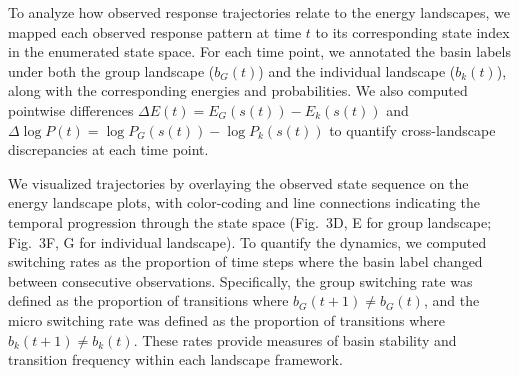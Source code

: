 To analyze how observed response trajectories relate to the energy landscapes, we mapped each observed response pattern at time $t$ to its corresponding state index in the enumerated state space. For each time point, we annotated the basin labels under both the group landscape ($b_G(t)$) and the individual landscape ($b_k(t)$), along with the corresponding energies and probabilities. We also computed pointwise differences $\Delta E(t) = E_G(s(t)) - E_k(s(t))$ and $\Delta \log P(t) = \log P_G(s(t)) - \log P_k(s(t))$ to quantify cross-landscape discrepancies at each time point.

We visualized trajectories by overlaying the observed state sequence on the energy landscape plots, with color-coding and line connections indicating the temporal progression through the state space (Fig.~3D, E for group landscape; Fig.~3F, G for individual landscape). To quantify the dynamics, we computed switching rates as the proportion of time steps where the basin label changed between consecutive observations. Specifically, the group switching rate was defined as the proportion of transitions where $b_G(t+1) \neq b_G(t)$, and the micro switching rate was defined as the proportion of transitions where $b_k(t+1) \neq b_k(t)$. These rates provide measures of basin stability and transition frequency within each landscape framework.
